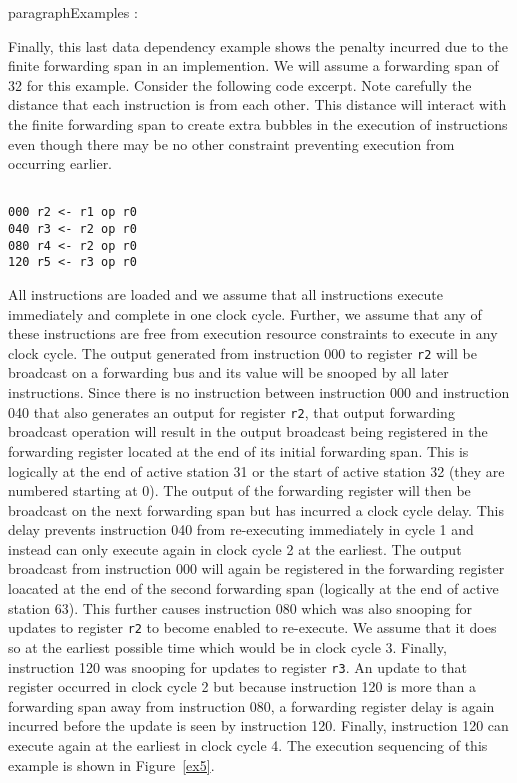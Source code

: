 paragraph{Examples : }

Finally, this last data dependency example shows the
penalty incurred due to the finite forwarding span
in an implemention.  We will assume a forwarding span
of 32 for this example.  Consider the following
code excerpt.  Note carefully the distance that each instruction
is from each other.  This distance will interact with
the finite forwarding span to create extra bubbles in
the execution of instructions even though there may be no other
constraint preventing execution from occurring earlier.

\begin{verbatim}

000	r2 <- r1 op r0
040	r3 <- r2 op r0
080	r4 <- r2 op r0
120	r5 <- r3 op r0

\end{verbatim}

All instructions are loaded and we assume that all
instructions execute immediately and complete in one clock cycle.
Further, we assume that any of these instructions are free
from execution resource constraints to execute in any clock cycle.
The output generated from instruction 000 to register
{\tt r2}
will be broadcast on a forwarding bus and its value will be snooped
by all later instructions.  Since there is no instruction
between instruction 000 and instruction 040 that also generates
an output for register
{\tt r2},
that output forwarding broadcast operation will result
in the output broadcast being registered in the forwarding register
located at the end of its initial forwarding span.  This
is logically at the end of active station 31 or the start of active station
32
(they are numbered starting at 0).
The output of the forwarding register will then be broadcast
on the next forwarding span but has incurred a clock cycle delay.
This delay prevents instruction 040 from re-executing immediately
in cycle 1 and instead can only execute again in clock cycle 2
at the earliest.  The output broadcast from instruction 000
will again be registered in the forwarding register loacated
at the end of the second forwarding span (logically at the
end of active station 63).  This further causes instruction 080
which was also snooping for updates to register
{\tt r2}
to become enabled to re-execute.  We assume that it does so
at the earliest possible time which would be in clock cycle 3.
Finally, instruction 120 was snooping for updates to register
{\tt r3}.
An update to that register occurred in clock cycle 2 but because
instruction 120 is more than a forwarding span away from instruction
080, a forwarding register delay is again incurred before the update
is seen by instruction 120.  Finally, instruction 120 can execute
again at the earliest in clock cycle 4.
The execution sequencing of this example is shown in
Figure~\ref{ex5}.


